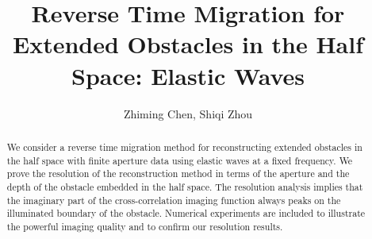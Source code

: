 \documentclass[12pt]{iopart}
\begin{document}

\def\debproof{\noindent {\bf Proof.} }
\def\finproof{\hfill {\small $\Box$} \\}

\makeatletter %
\makeatother  %
\renewcommand\theequation{{\thesection}.{\arabic{equation}}}
\title[RTM in the Elastic Medium Half Space]{Reverse Time Migration for Extended Obstacles in the Half Space: Elastic Waves}
\author{ Zhiming Chen, Shiqi Zhou }
\address{LSEC, Institute of Computational Mathematics, Academy of
	Mathematics and Systems Science, Chinese Academy of Sciences,
	Beijing 100190, China}

\begin{abstract}
	We consider a reverse time migration method for reconstructing extended
	obstacles in the half space with finite aperture data using elastic waves at a fixed
	frequency. We prove the resolution of the reconstruction method in terms of the
	aperture and the depth of the obstacle embedded in the half space. The resolution
	analysis implies that the imaginary part of the cross-correlation imaging function
	always peaks on the illuminated boundary of the obstacle. Numerical experiments
	are included to illustrate the powerful imaging quality and to confirm our resolution
	results. 
\end{abstract}
\maketitle
\newcommand{\eps}{\varepsilon}
\newcommand{\RR}{\mathcal{R}}
\newtheorem{lem}{Lemma}[section]
\newtheorem{prop}{Proposition}[section]
\newtheorem{cor}{Corollary}[section]
\newtheorem{thm}{Theorem}[section]
\newtheorem{rem}{Remark}[section]
\newtheorem{alg}{Algorithm}[section]
\newtheorem{assum}{Assumption}[section]
\newtheorem{definition}{Definition}[section]


\newcommand{\MyRoman}[1]{\rm\setcounter{RomanNumber}{#1}\Roman{RomanNumber}}
\end{document}
